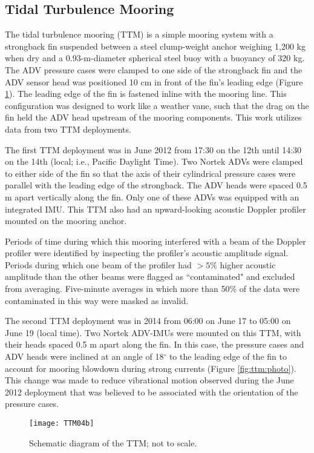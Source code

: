 \subsection{Tidal Turbulence Mooring}

The tidal turbulence mooring (TTM) is a simple mooring system with a strongback fin suspended between a steel clump-weight anchor weighing 1,200 kg when dry and a 0.93-m-diameter spherical steel buoy with a buoyancy of 320 kg. The ADV pressure cases were clamped to one side of the strongback fin and the ADV sensor head was positioned 10 cm in front of the fin's leading edge (Figure \ref{fig:ttm:diagram}). The leading edge of the fin is fastened inline with the mooring line. This configuration was designed to work like a weather vane, such that the drag on the fin held the ADV head upstream of the mooring components.  This work utilizes data from two TTM deployments. 

The first TTM deployment was in June 2012 from 17:30 on the 12th until 14:30 on the 14th (local; i.e., Pacific Daylight Time). Two Nortek ADVs were clamped to either side of the fin so that the axis of their cylindrical pressure cases were parallel with the leading edge of the strongback. The ADV heads were spaced 0.5 m apart vertically along the fin. Only one of these ADVs was equipped with an integrated IMU. This TTM also had an upward-looking acoustic Doppler profiler mounted on the mooring anchor.

Periods of time during which this mooring interfered with a beam of the Doppler profiler were identified by inspecting the profiler's acoustic amplitude signal. Periods during which one beam of the profiler had $>5\%$ higher acoustic amplitude than the other beams were flagged as ``contaminated" and excluded from averaging.  Five-minute averages in which more than 50\% of the data were contaminated in this way were masked as invalid.

The second TTM deployment was in 2014 from 06:00 on June 17 to 05:00 on June 19 (local time).  Two Nortek ADV-IMUs were mounted on this TTM, with their heads spaced 0.5 m apart along the fin. In this case, the pressure cases and ADV heads were inclined at an angle of 18$^\circ$ to the leading edge of the fin to account for mooring blowdown during strong currents (Figure \ref{fig:ttm:photo}). This change was made to reduce vibrational motion observed during the June 2012 deployment that was believed to be associated with the orientation of the pressure cases.

\begin{figure}[t]
  \centering
  \texttt{[image: TTM04b]}
  \caption{Schematic diagram of the TTM; not to scale.}
  \label{fig:ttm:diagram}
\end{figure}

